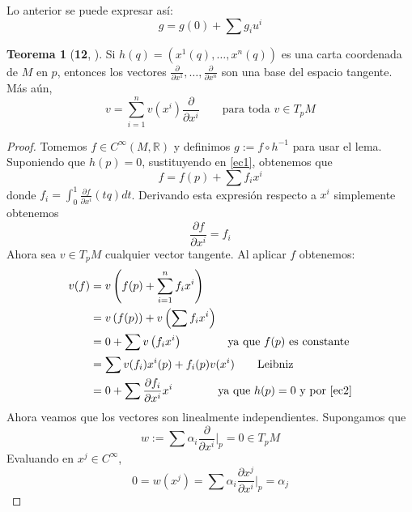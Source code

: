 \documentclass[spanish]{book}
\theoremstyle{definition}
\newtheorem*{teo}{Teorema}
\newcommand{\R}{\mathbb{R}}
\newcommand{\Cinf}{C^\infty}
\begin{document}
	Lo anterior se puede expresar así:
	\begin{equation}\label{ec1}
		g=g(0)+\sum g_iu^i
	\end{equation}
	\begin{teo}[\textbf{12}, \cite{ONeill}]\label{teo:base}
		Si $h(q)=(x^1(q),\ldots,x^n(q))$ es una carta coordenada de $M$ en $p$, entonces los vectores $\frac{\partial}{\partial x^1}, \ldots, \frac{\partial}{\partial x^n}
		$ son una base del espacio tangente. Más aún,
		\[v = \sum_{i=1}^n v(x^i) \frac{\partial}{\partial x^i} \qquad \text{para toda } v \in T_pM\]
	\end{teo}
	\begin{proof}
		Tomemos $f\in\Cinf(M,\R)$ y definimos $g:=f\circ h^{-1}$ para usar el lema. Suponiendo que $h(p)=0$, sustituyendo en \ref{ec1}, obtenemos que 
		\[f=f(p)+\sum f_ix^i\]
		donde $f_i=\int_0^1\frac{\partial f}{\partial x^i}(tq)dt$. Derivando esta expresión respecto a $x^i$ simplemente obtenemos
		\begin{equation}\label{ec2}
			\frac{\partial f}{\partial x^i}=f_i
		\end{equation}
		Ahora sea $v\in T_pM$ cualquier vector tangente. Al aplicar $f$ obtenemos:
		\begin{align*}
			v(f) &= v\left(f(p)+\sum_{i=1}^nf_ix^i\right) \\
			&= v\left(f(p)\right)+v\left(\sum f_i x^i\right) \\
			&=0+ \sum v\left(f_i x^i\right)\qquad\qquad\text{ya que }f(p)\text{ es constante} \\
			&=\sum v(f_i)x^i(p)+f_i(p)v(x^i)\qquad\text{Leibniz}\\
			&=0+\sum \frac{\partial f_i}{\partial x^i}x^i\qquad\qquad\text{ya que }h(p)=0\text{ y por }\ref{ec2}
		\end{align*}
		Ahora veamos que los vectores son linealmente independientes. Supongamos que
		\[w:=\sum\alpha_i\frac{\partial}{\partial{x^i}}\Bigg|_{p}=0\in T_pM\]
		Evaluando en $x^j\in\Cinf$,
		\[0=w(x^j)=\sum\alpha_i\frac{\partial x^j}{\partial{x^i}}\Bigg|_{p}=\alpha_j\]
	\end{proof}
\end{document}
